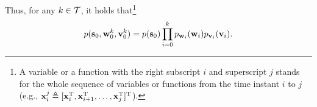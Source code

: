 \documentclass[conference,letterpaper]{IEEEtran}
\begin{document}
Thus, for any $k\in\mathcal{T}$, it holds that\footnote{A variable or a function with the right subscript $i$ and superscript $j$ stands for the whole sequence of variables or functions from the time instant $i$ to $j$ (e.g., $\mathbf{x}_{i}^{j} \triangleq [\mathbf{x}_{i}^{\text{T}},\mathbf{x}_{i+1}^{\text{T}},\ldots,\mathbf{x}_{j}^{\text{T}}]^{\text{T}}$).}
\begin{align}\label{ali:independence}
	p(\mathbf{s}_{0},\mathbf{w}_{0}^{k},\mathbf{v}_{0}^{k}) =	p(\mathbf{s}_{0})\prod_{i=0}^{k} p_{\mathbf{w}_{i}}(\mathbf{w}_{i})p_{\mathbf{v}_{i}}(\mathbf{v}_{i}).
\end{align}

\end{document}

